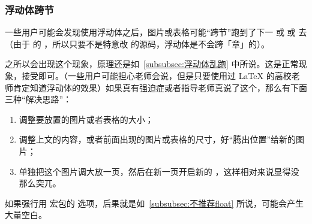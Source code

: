 \subsubsection{浮动体跨节}

一些用户可能会发现使用浮动体之后，图片或表格可能“跨节”跑到了下一  或  或  去（由于  的 ，所以只要不是特意改  的源码，浮动体是不会跨「章」的）。

之所以会出现这个现象，原理还是如~\ref{subsubsec:浮动体乱跑} 中所说。这是正常现象，接受即可。（一些用户可能担心老师会说，但是只要使用过 \LaTeX{} 的高校老师肯定知道浮动体的效果）如果真有强迫症或者指导老师真说了这个，那么有下面三种“解决思路”：

\begin{enumerate}
  \item 调整要放置的图片或者表格的大小；
  \item 调整上文的内容，或者前面出现的图片或表格的尺寸，好“腾出位置”给新的图片；
  \item 单独把这个图片调大放一页，然后在新一页开启新的 ，这样相对来说显得没那么突兀。
\end{enumerate}

如果强行用  宏包的  选项，后果就是如~\ref{subsubsec:不推荐float} 所说，可能会产生大量空白。